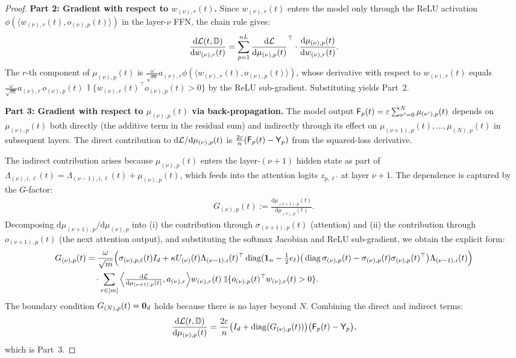\documentclass[11pt]{article}
\theoremstyle{plain}
\renewcommand{\d}{\mathrm{d}}
\DeclareMathOperator{\I}{\mathbb{I}}
\DeclareMathOperator{\diag}{diag}
\begin{document}
\begin{proof}
    {\bf Part 2: Gradient with respect to $w_{(\nu),r}(t)$.} Since $w_{(\nu),r}(t)$ enters the model only through the ReLU activation $\phi(\langle w_{(\nu),r}(t), o_{(\nu),p}(t)\rangle)$ in the layer-$\nu$ FFN, the chain rule gives:
    \begin{align*}
        \frac{\d{\cal L}(t,\mathbb{D})}{\d w_{(\nu),r}(t)} = \sum_{p=1}^{nL}\frac{\d{\cal L}}{\d\mu_{(\nu),p}(t)}^\top\cdot \frac{\d \mu_{(\nu),p}(t)}{\d w_{(\nu),r}(t)}.
    \end{align*}
    The $r$-th component of $\mu_{(\nu),p}(t)$ is $\frac{\omega}{\sqrt m} a_{(\nu),r}\phi(\langle w_{(\nu),r}(t), o_{(\nu),p}(t)\rangle)$, whose derivative with respect to $w_{(\nu),r}(t)$ equals $\frac{\omega}{\sqrt m} a_{(\nu),r}\, o_{(\nu),p}(t)\,\I\{w_{(\nu),r}(t)^\top o_{(\nu),p}(t)>0\}$ by the ReLU sub-gradient. Substituting yields Part~2.

    {\bf Part 3: Gradient with respect to $\mu_{(\nu),p}(t)$ via back-propagation.} The model output ${\sf F}_p(t) = \varepsilon\sum_{\nu'=0}^N \mu_{(\nu'),p}(t)$ depends on $\mu_{(\nu),p}(t)$ both directly (the additive term in the residual sum) and indirectly through its effect on $\mu_{(\nu+1),p}(t),\dots,\mu_{(N),p}(t)$ in subsequent layers. The direct contribution to $\d {\cal L}/\d \mu_{(\nu),p}(t)$ is $\frac{2\varepsilon}{n}({\sf F}_p(t)-{\sf Y}_p)$ from the squared-loss derivative.

    The indirect contribution arises because $\mu_{(\nu),p}(t)$ enters the layer-$(\nu+1)$ hidden state as part of $\Lambda_{(\nu),i,\ell}(t) = \Lambda_{(\nu-1),i,\ell}(t) + \mu_{(\nu),p}(t)$, which feeds into the attention logits $z_{p,\ell'}$ at layer $\nu+1$. The dependence is captured by the $G$-factor:
    \begin{align*}
        G_{(\nu),p}(t) := \frac{\d \mu_{(\nu+1),p}(t)}{\d \mu_{(\nu),p}(t)}.
    \end{align*}
    Decomposing $\d\mu_{(\nu+1),p}/\d\mu_{(\nu),p}$ into (i) the contribution through $\sigma_{(\nu+1),p}(t)$ (attention) and (ii) the contribution through $o_{(\nu+1),p}(t)$ (the next attention output), and substituting the softmax Jacobian and ReLU sub-gradient, we obtain the explicit form:
    \begin{align*}
        G_{(\nu),p}(t) &= \frac{\omega}{\sqrt m}\Big(\sigma_{(\nu),p,\ell}(t) I_d + \kappa U_{(\nu)}(t)\Lambda_{(\nu-1),i}(t)^\top\diag({\bf 1}_n-\tfrac{1}{2}e_\ell)\big(\diag\sigma_{(\nu),p}(t)-\sigma_{(\nu),p}(t)\sigma_{(\nu),p}(t)^\top\big)\Lambda_{(\nu-1),i}(t)\Big) \\
        &\quad\cdot \sum_{r\in[m]}\Big\langle\tfrac{\d{\cal L}}{\d\mu_{(\nu+1),p}(t)},a_{(\nu),r}\Big\rangle w_{(\nu),r}(t)\,\I\{o_{(\nu),p}(t)^\top w_{(\nu),r}(t)>0\}.
    \end{align*}
    The boundary condition $G_{(N),p}(t)={\bf 0}_d$ holds because there is no layer beyond $N$. Combining the direct and indirect terms:
    \begin{align*}
        \frac{\d{\cal L}(t,\mathbb{D})}{\d \mu_{(\nu),p}(t)} = \frac{2\varepsilon}{n}\big(I_d + \diag(G_{(\nu),p}(t))\big)\big({\sf F}_p(t) - {\sf Y}_p\big),
    \end{align*}
    which is Part~3.
\end{proof}
\end{document}
